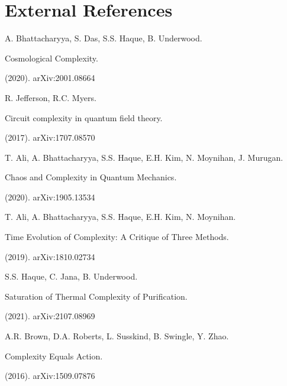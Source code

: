 \documentclass{article}
\newtheorem{External Info}[definition]{External Info}
\newtheorem{treatment}[definition]{Treatment}
\begin{document}
\section*{External References}
\begin{enumerate}[label={[\arabic*]}]\item A. Bhattacharyya, S. Das, S.S. Haque, B. Underwood. \begin{textit}Cosmological Complexity. \end{textit}(2020). arXiv:2001.08664
\item R. Jefferson, R.C. Myers. \begin{textit}Circuit complexity in quantum field theory. \end{textit}(2017). arXiv:1707.08570
\item T. Ali, A. Bhattacharyya, S.S. Haque, E.H. Kim, N. Moynihan, J. Murugan. \begin{textit}Chaos and Complexity in Quantum Mechanics. \end{textit}(2020). arXiv:1905.13534
\item T. Ali, A. Bhattacharyya, S.S. Haque, E.H. Kim, N. Moynihan. \begin{textit}Time Evolution of Complexity: A Critique of Three Methods. \end{textit}(2019). arXiv:1810.02734
\item S.S. Haque, C. Jana, B. Underwood. \begin{textit}Saturation of Thermal Complexity of Purification. \end{textit}(2021). arXiv:2107.08969
\item A.R. Brown, D.A. Roberts, L. Susskind, B. Swingle, Y. Zhao. \begin{textit}Complexity Equals Action. \end{textit}(2016). arXiv:1509.07876
\end{enumerate}
\end{document}
